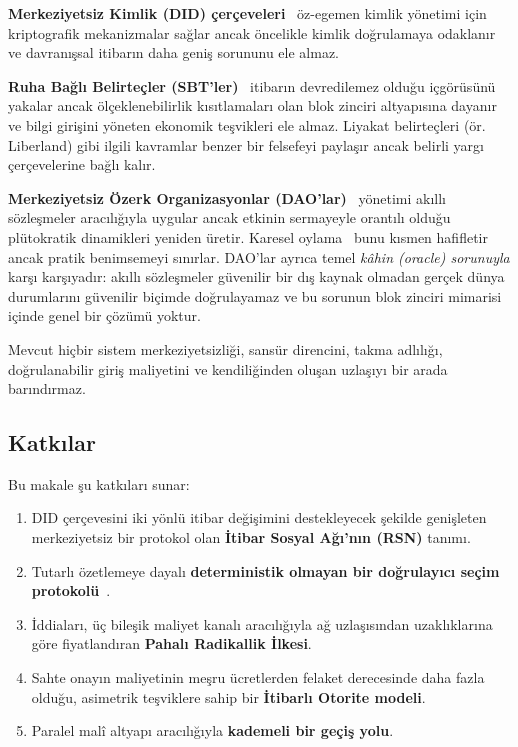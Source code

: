 \documentclass[11pt,a4paper,twocolumn]{article}
\begin{document}
\textbf{Merkeziyetsiz Kimlik (DID) çerçeveleri}~\cite{did2022} öz-egemen kimlik yönetimi için kriptografik mekanizmalar sağlar ancak öncelikle kimlik doğrulamaya odaklanır ve davranışsal itibarın daha geniş sorununu ele almaz.

\textbf{Ruha Bağlı Belirteçler (SBT'ler)}~\cite{weyl2022} itibarın devredilemez olduğu içgörüsünü yakalar ancak ölçeklenebilirlik kısıtlamaları olan blok zinciri altyapısına dayanır ve bilgi girişini yöneten ekonomik teşvikleri ele almaz. Liyakat belirteçleri (ör. Liberland) gibi ilgili kavramlar benzer bir felsefeyi paylaşır ancak belirli yargı çerçevelerine bağlı kalır.

\textbf{Merkeziyetsiz Özerk Organizasyonlar (DAO'lar)}~\cite{buterin2014} yönetimi akıllı sözleşmeler aracılığıyla uygular ancak etkinin sermayeyle orantılı olduğu plütokratik dinamikleri yeniden üretir. Karesel oylama~\cite{buterin2019} bunu kısmen hafifletir ancak pratik benimsemeyi sınırlar. DAO'lar ayrıca temel \emph{kâhin (oracle) sorunuyla} karşı karşıyadır: akıllı sözleşmeler güvenilir bir dış kaynak olmadan gerçek dünya durumlarını güvenilir biçimde doğrulayamaz ve bu sorunun blok zinciri mimarisi içinde genel bir çözümü yoktur.

Mevcut hiçbir sistem merkeziyetsizliği, sansür direncini, takma adlılığı, doğrulanabilir giriş maliyetini ve kendiliğinden oluşan uzlaşıyı bir arada barındırmaz.

\subsection{Katkılar}

Bu makale şu katkıları sunar:
\begin{enumerate}[nosep]
\item DID çerçevesini iki yönlü itibar değişimini destekleyecek şekilde genişleten merkeziyetsiz bir protokol olan \textbf{İtibar Sosyal Ağı'nın (RSN)} tanımı.
\item Tutarlı özetlemeye dayalı \textbf{deterministik olmayan bir doğrulayıcı seçim protokolü}~\cite{karger1997}.
\item İddiaları, üç bileşik maliyet kanalı aracılığıyla ağ uzlaşısından uzaklıklarına göre fiyatlandıran \textbf{Pahalı Radikallik İlkesi}.
\item Sahte onayın maliyetinin meşru ücretlerden felaket derecesinde daha fazla olduğu, asimetrik teşviklere sahip bir \textbf{İtibarlı Otorite modeli}.
\item Paralel malî altyapı aracılığıyla \textbf{kademeli bir geçiş yolu}.
\end{enumerate}
\end{document}
